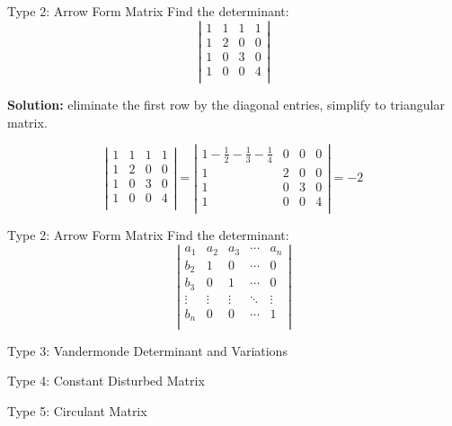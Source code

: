 \documentclass{beamer}
\begin{document}
\begin{frame}{Type 2: Arrow Form Matrix}
Find the determinant:
\begin{equation*}
    \left| \begin{matrix}
        1&		1&		1&		1		\\
        1&		2&		0&		0		\\
        1&		0&		3&		0		\\
        1&		0&		0&		4		\\
    \end{matrix} \right|
\end{equation*}

\textbf{Solution:} eliminate the first row by the diagonal entries, simplify to triangular matrix.

\begin{equation*}
    \left| \begin{matrix}
        1&		1&		1&		1\\
        1&		2&		0&		0\\
        1&		0&		3&		0\\
        1&		0&		0&		4\\
    \end{matrix} \right|=\left| \begin{matrix}
        1-\frac{1}{2}-\frac{1}{3}-\frac{1}{4}&		0&		0&		0\\
        1&		2&		0&		0\\
        1&		0&		3&		0\\
        1&		0&		0&		4\\
    \end{matrix} \right|=-2
\end{equation*}
\end{frame}

\begin{frame}{Type 2: Arrow Form Matrix}
Find the determinant:
\begin{equation*}
\left| \begin{matrix}
	a_1&		a_2&		a_3&		\cdots&		a_n\\
	b_2&		1&		0&		\cdots&		0\\
	b_3&		0&		1&		\cdots&		0\\
	\vdots&		\vdots&		\vdots&		\ddots&		\vdots\\
	b_n&		0&		0&		\cdots&		1\\
\end{matrix} \right|
\end{equation*}

\end{frame}

\begin{frame}{Type 3: Vandermonde Determinant and Variations}
    
\end{frame}

\begin{frame}{Type 4: Constant Disturbed Matrix}
    
\end{frame}

\begin{frame}{Type 5: Circulant Matrix}
    
\end{frame}
\end{document}

